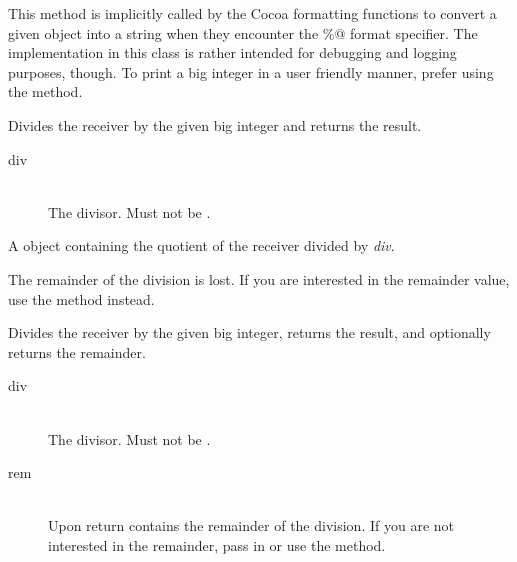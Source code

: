This method is implicitly called by the Cocoa formatting functions to convert a given object into a string when they encounter the \%@ format specifier. The implementation in this  class is rather intended for debugging and logging purposes, though. To print a big integer in a user friendly manner, prefer using the  method.



Divides the receiver by the given big integer and returns the result.


\docparams

\begin{description}
\item[div] \hfill \\ The divisor. Must not be .
\end{description}

\docretval

A  object containing the quotient of the receiver divided by \emph{div}.

\docdiscuss

The remainder of the division is lost. If you are interested in the remainder value, use the  method instead.



Divides the receiver by the given big integer, returns the result, and optionally returns the remainder.


\docparams

\begin{description}
\item[div] \hfill \\ The divisor. Must not be .
\item[rem] \hfill \\ Upon return contains the remainder of the division. If you are not interested in the remainder, pass in  or use the  method.
\end{description}

\docretval

